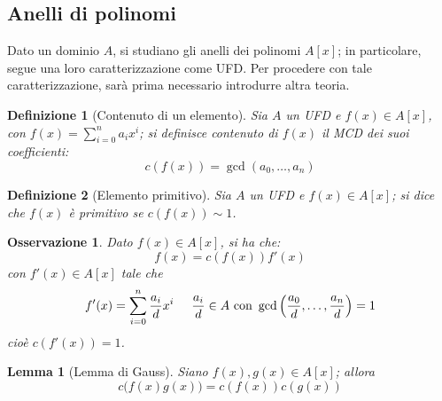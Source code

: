 \documentclass[11pt]{article}
\theoremstyle{style}
\newtheorem{definizione}{Definizione}[section]
\newtheorem{lemma}{Lemma}[teorema]
\newtheorem{osservazione}{Osservazione}[section]
\numberwithin{equation}{subsection}
\begin{document}
\subsection{Anelli di polinomi}
Dato un dominio $A$, si studiano gli anelli dei polinomi $A[x]$; in particolare, segue una loro caratterizzazione come UFD.
Per procedere con tale caratterizzazione, sar\`a prima necessario introdurre altra teoria.
\begin{definizione}
	[Contenuto di un elemento]
	Sia $A$ un UFD e $f(x) \in A[x]$, con $f(x) = \sum_{i=0}^{n} a_ix^i$; si definisce \textit{contenuto} di $f(x)$ il MCD dei suoi coefficienti:
	\[
	c(f(x))=\operatorname{gcd}(a_0,\ldots,a_n) 
	\] 
\end{definizione}
\begin{definizione}
	[Elemento primitivo]
	Sia $A$ un UFD e $f(x) \in A[x]$; si dice che $f(x)$ \`e \textit{primitivo} se $c(f(x)) \sim 1$.
\end{definizione}
\begin{osservazione}
	Dato $f(x) \in A[x]$, si ha che:
	\[
	f(x) = c(f(x)) f'(x)
	\] 
	con $f'(x) \in A[x]$ tale che 
\[
f'(x) = \sum_{i=0}^{n} \frac{a_i}{d}x^i \hspace{.5cm} \frac{a_i}{d} \in A \text{ con } \operatorname{gcd}\left(\frac{a_0}{d},\ldots, \frac{a_n}{d}\right) = 1
\] 
	cio\`e $c(f'(x)) = 1$.
\end{osservazione}
\begin{lemma}
	[Lemma di Gauss]
	Siano $f(x), g(x) \in A[x]$; allora
	\[
		c\big(f(x)g(x)\big) = c(f(x)) c(g(x))
	\] 
\end{lemma}
\end{document}
